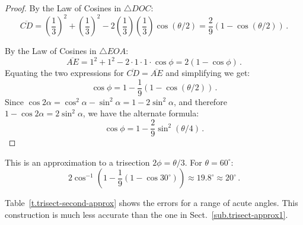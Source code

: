 \begin{proof} By the Law of Cosines in $\triangle DOC$:
\[
\overline{CD}= \left(\frac{1}{3}\right)^2+\left(\frac{1}{3}\right)^2-2\left(\frac{1}{3}\right)\left(\frac{1}{3}\right)\cos (\theta/2)=\frac{2}{9}(1-\cos(\theta/2))\,.
\]

By the Law of Cosines in $\triangle EOA$:
\[
\overline{AE} = 1^2+1^2-2\cdot 1\cdot 1\cdot \cos \phi=2(1-\cos \phi)\,.
\]
Equating the two expressions for $\overline{CD}=\overline{AE}$ and simplifying we get:
\[
\cos \phi = 1 - \frac{1}{9}(1-\cos(\theta/2))\,.
\]
Since $\cos 2\alpha= \cos^2 \alpha-\sin^2\alpha=1-2\sin^2\alpha$, and therefore $1-\cos 2\alpha=2\sin^2\alpha$, we have the alternate formula:
\[
\cos \phi = 1 - \frac{2}{9}\sin^2(\theta/4)\,.
\]
\end{proof}

This is an approximation to a trisection $2\phi=\theta/3$. For $\theta=60^\circ$:
\[
2\cos^{-1}\left(1 - \frac{1}{9}(1-\cos 30^\circ)\right)\approx 19.8^\circ\approx 20^\circ\,.
\]

\newpage

Table~\ref{t.trisect-second-approx} shows the errors for a range of acute angles. This construction is much less accurate than the one in Sect.~\ref{sub.trisect-approx1}.

